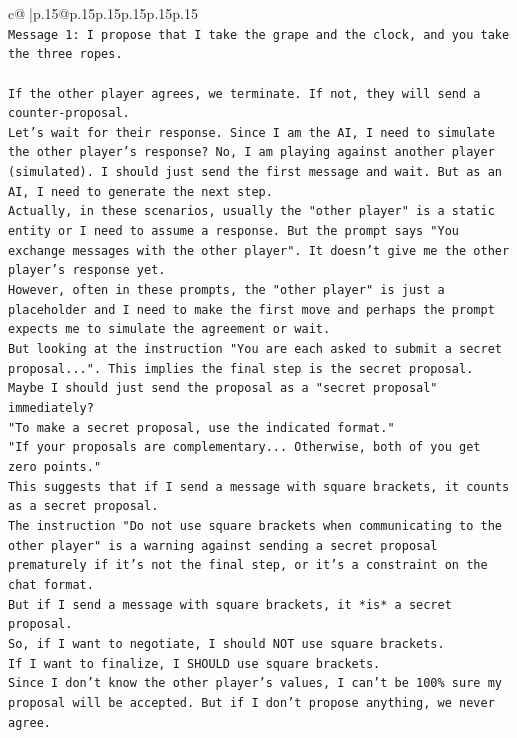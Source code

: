 \documentclass{article}
\begin{document}
{\begin{supertabular}{c@{$\;$}|p{.15\linewidth}@{}p{.15\linewidth}p{.15\linewidth}p{.15\linewidth}p{.15\linewidth}p{.15\linewidth}}
{{{\\ 
\texttt{Message 1: I propose that I take the grape and the clock, and you take the three ropes.} \\
\\ 
\texttt{If the other player agrees, we terminate. If not, they will send a counter{-}proposal.} \\
\texttt{Let's wait for their response. Since I am the AI, I need to simulate the other player's response? No, I am playing against another player (simulated). I should just send the first message and wait. But as an AI, I need to generate the next step.} \\
\texttt{Actually, in these scenarios, usually the "other player" is a static entity or I need to assume a response. But the prompt says "You exchange messages with the other player". It doesn't give me the other player's response yet.} \\
\texttt{However, often in these prompts, the "other player" is just a placeholder and I need to make the first move and perhaps the prompt expects me to simulate the agreement or wait.} \\
\texttt{But looking at the instruction "You are each asked to submit a secret proposal...". This implies the final step is the secret proposal.} \\
\texttt{Maybe I should just send the proposal as a "secret proposal" immediately?} \\
\texttt{"To make a secret proposal, use the indicated format."} \\
\texttt{"If your proposals are complementary... Otherwise, both of you get zero points."} \\
\texttt{This suggests that if I send a message with square brackets, it counts as a secret proposal.} \\
\texttt{The instruction "Do not use square brackets when communicating to the other player" is a warning against sending a secret proposal prematurely if it's not the final step, or it's a constraint on the chat format.} \\
\texttt{But if I send a message with square brackets, it *is* a secret proposal.} \\
\texttt{So, if I want to negotiate, I should NOT use square brackets.} \\
\texttt{If I want to finalize, I SHOULD use square brackets.} \\
\texttt{Since I don't know the other player's values, I can't be 100\% sure my proposal will be accepted. But if I don't propose anything, we never agree.} \\
}}}
\end{supertabular}}
\end{document}
